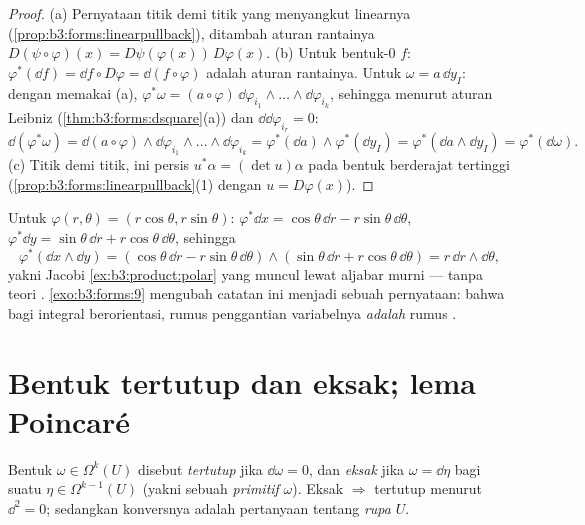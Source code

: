 \begin{proof}
(a) Pernyataan titik demi titik yang menyangkut  linearnya
(\cref{prop:b3:forms:linearpullback}), ditambah aturan rantainya
$D(\psi\circ\varphi)(x) = D\psi(\varphi(x))\,D\varphi(x)$.
(b) Untuk bentuk-$0$ $f$: $\varphi^*(\dd f) = \dd f \circ
D\varphi = \dd(f \circ \varphi)$ adalah aturan rantainya. Untuk
$\omega = a\,\dd y_I$: dengan memakai (a), $\varphi^*\omega =
(a\circ\varphi)\,\dd\varphi_{i_1}\wedge\dots\wedge
\dd\varphi_{i_k}$, sehingga menurut aturan Leibniz
(\cref{thm:b3:forms:dsquare}(a)) dan $\dd\dd\varphi_{i_r} =
0$:
\[
\dd(\varphi^*\omega) = \dd(a\circ\varphi) \wedge
\dd\varphi_{i_1}\wedge\dots\wedge\dd\varphi_{i_k}
= \varphi^*(\dd a) \wedge \varphi^*(\dd y_I)
= \varphi^*(\dd a \wedge \dd y_I) =
\varphi^*(\dd\omega).
\]
(c) Titik demi titik, ini persis $u^*\alpha = (\det u)\alpha$
pada bentuk berderajat tertinggi (\cref{prop:b3:forms:linearpullback}(1)
dengan $u = D\varphi(x)$).
\end{proof}

\begin{example}\label{ex:b3:forms:polar}
Untuk $\varphi(r, \theta) = (r\cos\theta, r\sin\theta)$:
$\varphi^*\dd x = \cos\theta\,\dd r -
r\sin\theta\,\dd\theta$, $\varphi^*\dd y = \sin\theta\,\dd r
+ r\cos\theta\,\dd\theta$, sehingga
\[
\varphi^*(\dd x \wedge \dd y) =
(\cos\theta\,\dd r - r\sin\theta\,\dd\theta) \wedge
(\sin\theta\,\dd r + r\cos\theta\,\dd\theta)
= r\,\dd r \wedge \dd\theta,
\]
yakni Jacobi \cref{ex:b3:product:polar} yang muncul lewat aljabar
murni --- tanpa teori . \cref{exo:b3:forms:9} mengubah
catatan ini menjadi sebuah pernyataan: bahwa bagi integral berorientasi,
rumus penggantian variabelnya \emph{adalah} rumus .
\end{example}

\section{Bentuk tertutup dan eksak; lema Poincaré}

\begin{definition}\label{def:b3:forms:closedexact}
Bentuk $\omega \in \Omega^k(U)$ disebut \emph{tertutup}
jika $\dd\omega = 0$, dan \emph{eksak} jika
$\omega = \dd\eta$ bagi suatu $\eta \in \Omega^{k-1}(U)$ (yakni sebuah
\emph{primitif} $\omega$). Eksak $\Rightarrow$ tertutup menurut
$\dd^2 = 0$; sedangkan konversnya adalah pertanyaan tentang
\emph{rupa} $U$.
\end{definition}

